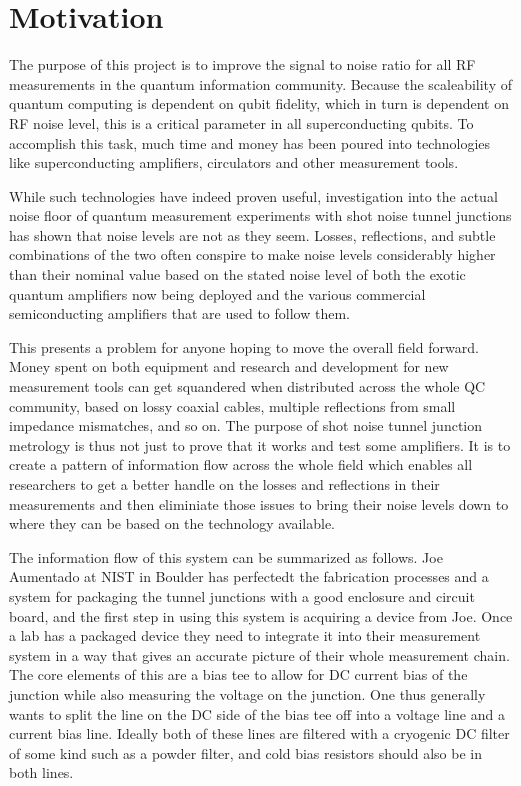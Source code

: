 \documentclass[11pt]{article}
\begin{document}
\section{
Motivation}



    The purpose of this project is to improve the signal to noise ratio for all RF measurements in the quantum information community.  Because the scaleability of quantum computing is dependent on qubit fidelity, which in turn is dependent on RF noise level, this is a critical parameter in all superconducting qubits.  To accomplish this task, much time and money has been poured into technologies like superconducting amplifiers, circulators and other measurement tools. 
 



     While such technologies have indeed proven useful, investigation into the actual noise floor of quantum measurement experiments with shot noise tunnel junctions has shown that noise levels are not as they seem.  Losses, reflections, and subtle combinations of the two often conspire to make noise levels considerably higher than their nominal value based on the stated noise level of both the exotic quantum amplifiers now being deployed and the various commercial semiconducting amplifiers that are used to follow them. 




    This presents a problem for anyone hoping to move the overall field forward.  Money spent on both equipment and research and development for new measurement tools can get squandered when distributed across the whole QC community, based on lossy coaxial cables, multiple reflections from small impedance mismatches, and so on.  The purpose of shot noise tunnel junction metrology is thus not just to prove that it works and test some amplifiers.  It is to create a pattern of information flow across the whole field which enables all researchers to get a better handle on the losses and reflections in their measurements and then eliminiate those issues to bring their noise levels down to where they can be based on the technology available.  



The information flow of this system can be summarized as follows.  Joe Aumentado at NIST in Boulder has perfectedt the fabrication processes and a system for packaging the tunnel junctions with a good enclosure and circuit board, and the first step in using this system is acquiring a device from Joe.  Once a lab has a packaged device they need to integrate it into their measurement system in a way that gives an accurate picture of their whole measurement chain.  The core elements of this are a bias tee to allow for DC current bias of the junction while also measuring the voltage on the junction.  One thus generally wants to split the line on the DC side of the bias tee off into a voltage line and a current bias line.  Ideally both of these lines are filtered with a cryogenic DC filter of some kind such as a powder filter, and cold bias resistors should also be in both lines.
\end{document}
